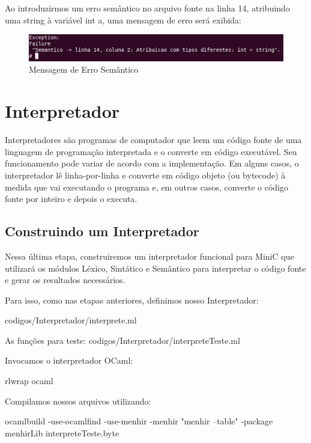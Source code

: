 \documentclass[12pt,a4paper,twoside]{report}
\begin{document}
Ao introduzirmos um erro semântico no arquivo fonte na linha 14, atribuindo uma string à variável int a, uma mensagem de erro será exibida:

\begin{figure}[!h]
\centering
\caption{Mensagem de Erro Semântico} \label{fig:semantico}
\includegraphics[scale=0.5]{imagens/errosemantico.png}
\end{figure}

\chapter{Interpretador}
Interpretadores são programas de computador que leem um código fonte de uma linguagem de programação interpretada e o converte em código executável. Seu funcionamento pode variar de acordo com a implementação. Em alguns casos, o interpretador lê linha-por-linha e converte em código objeto (ou bytecode) à medida que vai executando o programa e, em outros casos, converte o código fonte por inteiro e depois o executa.

\section{Construindo um Interpretador}
Nessa última etapa, construiremos um interpretador funcional para MiniC que utilizará os módulos Léxico, Sintático e Semântico para interpretar o código fonte e gerar os resultados necessários.

Para isso, como nas etapas anteriores, definimos nosso Interpretador:

 {codigos/Interpretador/interprete.ml}

As funções para teste:
 {codigos/Interpretador/interpreteTeste.ml}

Invocamos o interpretador OCaml:

\begin{terminal}
rlwrap ocaml
\end{terminal}

Compilamos nossos arquivos utilizando:

\begin{terminal}
ocamlbuild -use-ocamlfind -use-menhir -menhir "menhir --table" -package menhirLib interpreteTeste.byte
\end{terminal}
\end{document}
